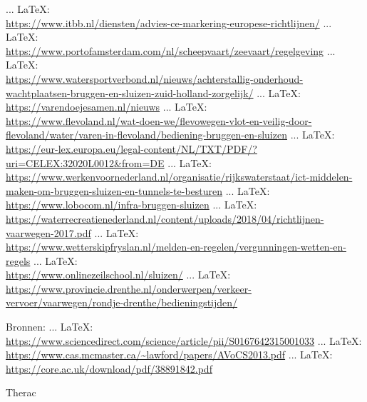 \begin{thebibliography}{99}
{{{{				 ... \LaTeX:\\ \url{https://www.itbb.nl/diensten/advies-ce-markering-europese-richtlijnen/}
				 ... \LaTeX:\\ \url{https://www.portofamsterdam.com/nl/scheepvaart/zeevaart/regelgeving}
				 ... \LaTeX:\\ \url{https://www.watersportverbond.nl/nieuws/achterstallig-onderhoud-wachtplaatsen-bruggen-en-sluizen-zuid-holland-zorgelijk/}
				 ... \LaTeX:\\ \url{https://varendoejesamen.nl/nieuws}
				 ... \LaTeX:\\ \url{https://www.flevoland.nl/wat-doen-we/flevowegen-vlot-en-veilig-door-flevoland/water/varen-in-flevoland/bediening-bruggen-en-sluizen}
				 ... \LaTeX:\\ \url{https://eur-lex.europa.eu/legal-content/NL/TXT/PDF/?uri=CELEX:32020L0012&from=DE}
				 ... \LaTeX:\\ \url{https://www.werkenvoornederland.nl/organisatie/rijkswaterstaat/ict-middelen-maken-om-bruggen-sluizen-en-tunnels-te-besturen}
				 ... \LaTeX:\\ \url{https://www.lobocom.nl/infra-bruggen-sluizen}
				 ... \LaTeX:\\ \url{https://waterrecreatienederland.nl/content/uploads/2018/04/richtlijnen-vaarwegen-2017.pdf}
				 ... \LaTeX:\\ \url{https://www.wetterskipfryslan.nl/melden-en-regelen/vergunningen-wetten-en-regels}
				 ... \LaTeX:\\ \url{https://www.onlinezeilschool.nl/sluizen/}
				 ... \LaTeX:\\ \url{https://www.provincie.drenthe.nl/onderwerpen/verkeer-vervoer/vaarwegen/rondje-drenthe/bedieningstijden/}
				
				
				
				
				
				Bronnen:
				 ... \LaTeX:\\ \url{https://www.sciencedirect.com/science/article/pii/S0167642315001033}
				 ... \LaTeX:\\ \url{https://www.cas.mcmaster.ca/~lawford/papers/AVoCS2013.pdf}
				 ... \LaTeX:\\ \url{https://core.ac.uk/download/pdf/38891842.pdf}
				
				Therac
				
}}}}
\end{thebibliography}
